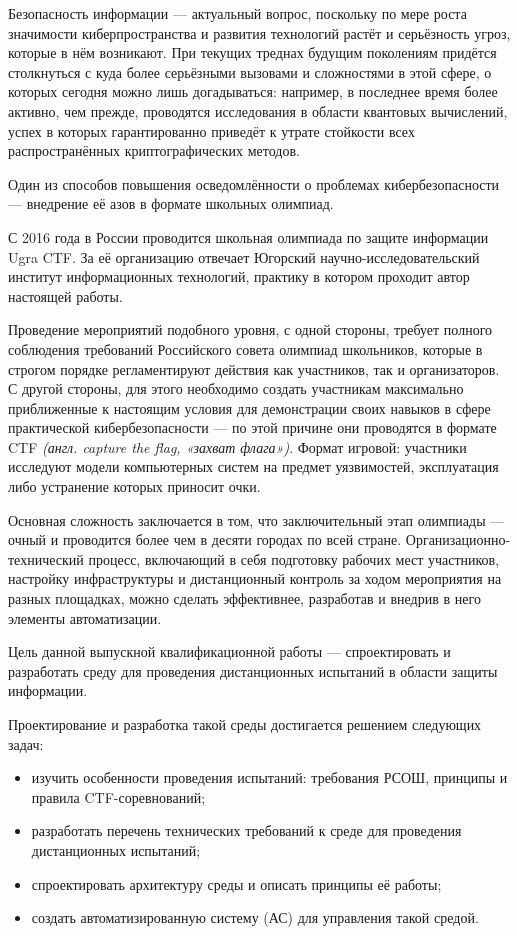 \Introduction
Безопасность информации — актуальный вопрос, поскольку по мере роста значимости киберпространства и развития технологий растёт и серьёзность угроз, которые в нём возникают. При текущих треднах будущим поколениям придётся столкнуться с куда более серьёзными вызовами и сложностями в этой сфере, о которых сегодня можно лишь догадываться: например, в последнее время более активно, чем прежде, проводятся исследования в области квантовых вычислений\cite{Quantum1}\cite{Quantum2}, успех в которых гарантированно приведёт к утрате стойкости всех распространённых криптографических методов\cite{Quantum3}.

Один из способов повышения осведомлённости о проблемах кибербезопасности — внедрение её азов в формате школьных олимпиад.

С 2016 года в России проводится школьная олимпиада по защите информации Ugra CTF\cite{UgraHistory}. За её организацию отвечает Югорский научно-исследовательский институт информационных технологий, практику в котором проходит автор настоящей работы.

Проведение мероприятий подобного уровня, с одной стороны, требует полного соблюдения требований Российского совета олимпиад школьников\cite{Rosolymp}, которые в строгом порядке регламентируют действия как участников, так и организаторов. С другой стороны, для этого необходимо создать участникам максимально приближенные к настоящим условия для демонстрации своих навыков в сфере практической кибербезопасности — по этой причине они проводятся в формате CTF \textit{(англ. capture the flag, «захват флага»)}. Формат игровой: участники исследуют модели компьютерных систем на предмет уязвимостей, эксплуатация либо устранение которых приносит очки.

Основная сложность заключается в том, что заключительный этап олимпиады --- очный и проводится более чем в десяти городах по всей стране\cite{Statforma}. Организационно-технический процесс, включающий в себя подготовку рабочих мест участников, настройку инфраструктуры и дистанционный контроль за ходом мероприятия на разных площадках, можно сделать эффективнее, разработав и внедрив в него элементы автоматизации.

Цель данной выпускной квалификационной работы --- спроектировать и разработать среду для проведения дистанционных испытаний в области защиты информации.

Проектирование и разработка такой среды достигается решением следующих задач:
\begin{itemize}
\item изучить особенности проведения испытаний: требования РСОШ, принципы и правила CTF-соревнований;
\item разработать перечень технических требований к среде для проведения дистанционных испытаний;
\item спроектировать архитектуру среды и описать принципы её работы;
\item создать автоматизированную систему (АС) для управления такой средой.
\end{itemize}
